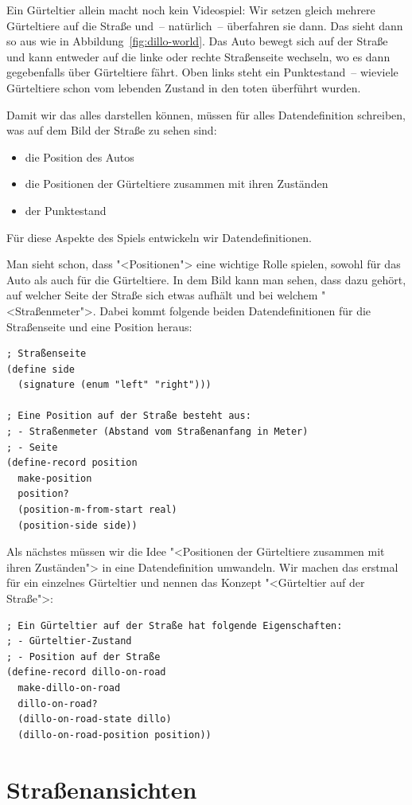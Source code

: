 Ein Gürteltier allein macht noch kein Videospiel: Wir setzen gleich
mehrere Gürteltiere auf die Straße und~-- natürlich~-- überfahren sie
dann.  Das sieht dann so aus wie in
Abbildung~\ref{fig:dillo-world}. Das Auto bewegt sich auf der Straße
und kann entweder auf die linke oder rechte Straßenseite wechseln, wo
es dann gegebenfalls über Gürteltiere fährt.  Oben links steht ein
Punktestand~-- wieviele Gürteltiere schon vom lebenden Zustand in den
toten überführt wurden.

Damit wir das alles darstellen können, müssen für alles
Datendefinition schreiben, was auf dem Bild der Straße zu sehen sind:
%
\begin{itemize}
\item die Position des Autos
\item die Positionen der Gürteltiere zusammen mit ihren Zuständen
\item der Punktestand
\end{itemize}
%
Für diese Aspekte des Spiels entwickeln wir Datendefinitionen.

Man sieht schon, dass "<Positionen"> eine wichtige Rolle spielen,
sowohl für das Auto als auch für die Gürteltiere.  In dem Bild kann
man sehen, dass dazu gehört, auf welcher Seite der Straße sich etwas
aufhält und bei welchem "<Straßenmeter">.  Dabei kommt folgende beiden
Datendefinitionen für die Straßenseite und eine Position heraus:
%
\begin{lstlisting}
; Straßenseite
(define side
  (signature (enum "left" "right")))

; Eine Position auf der Straße besteht aus:
; - Straßenmeter (Abstand vom Straßenanfang in Meter)
; - Seite
(define-record position
  make-position
  position?
  (position-m-from-start real)
  (position-side side))
\end{lstlisting}
%
Als nächstes müssen wir die Idee "<Positionen der Gürteltiere zusammen
mit ihren Zuständen"> in eine Datendefinition umwandeln.  Wir machen
das erstmal für ein einzelnes Gürteltier und nennen das Konzept
"<Gürteltier auf der Straße">:
%
\begin{lstlisting}
; Ein Gürteltier auf der Straße hat folgende Eigenschaften:
; - Gürteltier-Zustand
; - Position auf der Straße
(define-record dillo-on-road
  make-dillo-on-road
  dillo-on-road?
  (dillo-on-road-state dillo)
  (dillo-on-road-position position))
\end{lstlisting}
%

\section{Straßenansichten}

